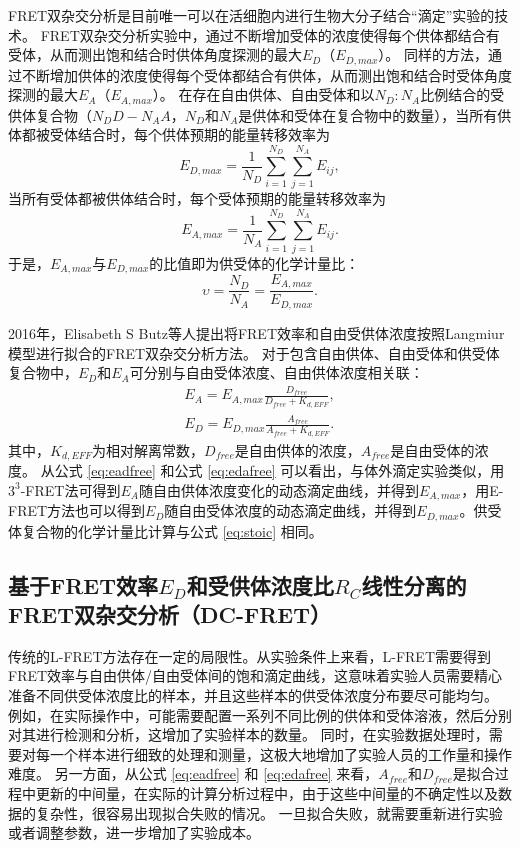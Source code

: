 FRET双杂交分析是目前唯一可以在活细胞内进行生物大分子结合“滴定”实验的技术。
FRET双杂交分析实验中，通过不断增加受体的浓度使得每个供体都结合有受体，从而测出饱和结合时供体角度探测的最大$E_D$（$E_{D,max}$）。
同样的方法，通过不断增加供体的浓度使得每个受体都结合有供体，从而测出饱和结合时受体角度探测的最大$E_A$（$E_{A,max}$）。
在存在自由供体、自由受体和以$N_D:N_A$比例结合的受供体复合物（$N_DD-N_AA$，$N_D$和$N_A$是供体和受体在复合物中的数量），当所有供体都被受体结合时，每个供体预期的能量转移效率为
\begin{equation}
    E_{D,max}=\frac{1}{N_D} \sum_{i=1}^{N_D} \sum_{j=1}^{N_A} E_{ij},
\end{equation}
当所有受体都被供体结合时，每个受体预期的能量转移效率为
\begin{equation}
    E_{A,max}=\frac{1}{N_A} \sum_{i=1}^{N_D} \sum_{j=1}^{N_A} E_{ij}.
\end{equation}
于是，$E_{A,max}$与$E_{D,max}$的比值即为供受体的化学计量比：
\begin{equation}
    \upsilon = \frac{N_D}{N_A} = \frac{E_{A,max}}{E_{D,max}}. \label{eq:stoic}
\end{equation}

2016年，Elisabeth S Butz等人提出将FRET效率和自由受供体浓度按照Langmiur模型进行拟合的FRET双杂交分析方法。
对于包含自由供体、自由受体和供受体复合物中，$E_D$和$E_A$可分别与自由受体浓度、自由供体浓度相关联：
\begin{align}
    E_A = E_{A,max} \frac{D_{free}}{D_{free}+K_{d,EFF}}, \label{eq:eadfree} \\
    E_D = E_{D,max} \frac{A_{free}}{A_{free}+K_{d,EFF}}. \label{eq:edafree}
\end{align}
其中，$K_{d,EFF}$为相对解离常数，$D_{free}$是自由供体的浓度，$A_{free}$是自由受体的浓度。
从公式 \ref{eq:eadfree} 和公式 \ref{eq:edafree} 可以看出，与体外滴定实验类似，用$3^3$-FRET法可得到$E_A$随自由供体浓度变化的动态滴定曲线，并得到$E_{A,max}$，用E-FRET方法也可以得到$E_D$随自由受体浓度的动态滴定曲线，并得到$E_{D,max}$。供受体复合物的化学计量比计算与公式 \ref{eq:stoic} 相同。
\fi

\subsection{\texorpdfstring{基于FRET效率$E_D$和受供体浓度比$R_C$线性分离的FRET双杂交分析（DC-FRET）}{基于FRET效率Ed和受供体浓度比Rc线性分离的FRET双杂交分析（DC-FRET）}}

\ifshowtext
传统的L-FRET方法存在一定的局限性。从实验条件上来看，L-FRET需要得到FRET效率与自由供体/自由受体间的饱和滴定曲线，这意味着实验人员需要精心准备不同供受体浓度比的样本，并且这些样本的供受体浓度分布要尽可能均匀。
例如，在实际操作中，可能需要配置一系列不同比例的供体和受体溶液，然后分别对其进行检测和分析，这增加了实验样本的数量。
同时，在实验数据处理时，需要对每一个样本进行细致的处理和测量，这极大地增加了实验人员的工作量和操作难度。
另一方面，从公式 \ref{eq:eadfree} 和 \ref{eq:edafree} 来看，$A_{free}$和$D_{free}$是拟合过程中更新的中间量，在实际的计算分析过程中，由于这些中间量的不确定性以及数据的复杂性，很容易出现拟合失败的情况。
一旦拟合失败，就需要重新进行实验或者调整参数，进一步增加了实验成本。


